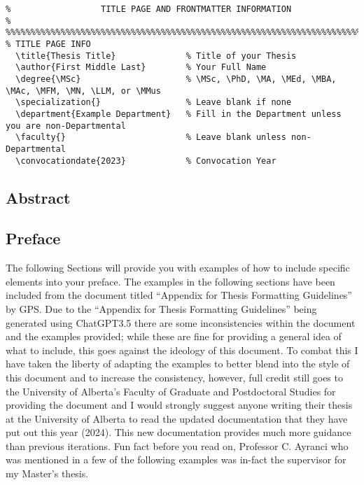 			\begin{lstlisting}[float=ht,caption=Example of How to Set Title Page Info,label=lst:TitlePage,style=LaTeXStyle,basicstyle=\scriptsize\ttfamily,]
%%%%%%%%%%%%%%%%%%%%%%%%%%%%%%%%%%%%%%%%%%%%%%%%%%%%%%%%%%%%%%%%%%%%%%%%%%%%%%%%
%                  TITLE PAGE AND FRONTMATTER INFORMATION                      %
%%%%%%%%%%%%%%%%%%%%%%%%%%%%%%%%%%%%%%%%%%%%%%%%%%%%%%%%%%%%%%%%%%%%%%%%%%%%%%%%
% TITLE PAGE INFO
  \title{Thesis Title}              % Title of your Thesis
  \author{First Middle Last}        % Your Full Name
  \degree{\MSc}                     % \MSc, \PhD, \MA, \MEd, \MBA, \MAc, \MFM, \MN, \LLM, or \MMus
  \specialization{}                 % Leave blank if none
  \department{Example Department}   % Fill in the Department unless you are non-Departmental
  \faculty{}                        % Leave blank unless non-Departmental
  \convocationdate{2023}            % Convocation Year
			\end{lstlisting}
	
		\subsection{Abstract}\label{abstract}
			

		\subsection{Preface}\label{preface}
			The following Sections will provide you with examples of how to include specific elements into your preface.
			The examples in the following sections have been included from the document titled ``Appendix for Thesis Formatting Guidelines'' by GPS\cite{FGPS2024}.
			Due to the ``Appendix for Thesis Formatting Guidelines'' being generated using ChatGPT3.5 there are some inconsistencies within the document and the examples provided; while these are fine for providing a general idea of what to include, this goes against the ideology of this document.
			To combat this I have taken the liberty of adapting the examples to better blend into the style of this document and to increase the consistency, however, full credit still goes to the University of Alberta's Faculty of Graduate and Postdoctoral Studies for providing the document and I would strongly suggest anyone writing their thesis at the University of Alberta to read the updated documentation that they have put out this year (2024).
			This new documentation provides much more guidance than previous iterations.
			Fun fact before you read on, Professor C. Ayranci who was mentioned in a few of the following examples was in-fact the supervisor for my Master's thesis.
			
